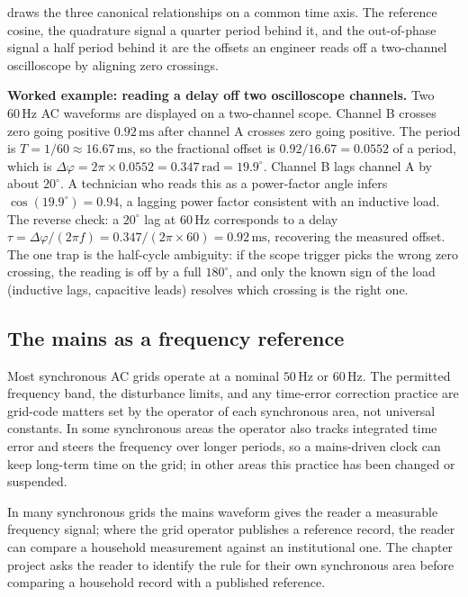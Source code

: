  draws the three canonical
relationships on a common time axis. The reference cosine, the
quadrature signal a quarter period behind it, and the out-of-phase
signal a half period behind it are the offsets an engineer reads off
a two-channel oscilloscope by aligning zero crossings.



\textbf{Worked example: reading a delay off two oscilloscope
channels.} Two $60 \,\si{\hertz}$ AC waveforms are displayed on a
two-channel scope. Channel B crosses zero going positive $0.92 \,\si
{\milli\second}$ after channel A crosses zero going positive. The
period is $T = 1/60 \approx 16.67 \,\si{\milli\second}$, so the
fractional offset is $0.92/16.67 = 0.0552$ of a period, which is
$\Delta\varphi = 2\pi \times 0.0552 = 0.347 \,\si{\radian} =
19.9^{\circ}$. Channel B lags channel A by about $20^{\circ}$. A
technician who reads this as a power-factor angle infers
$\cos(19.9^{\circ}) = 0.94$, a lagging power factor consistent with
an inductive load. The reverse check: a $20^{\circ}$ lag at $60 \,\si
{\hertz}$ corresponds to a delay $\tau = \Delta\varphi/(2\pi f) =
0.347/(2\pi \times 60) = 0.92 \,\si{\milli\second}$, recovering the
measured offset. The one trap is the half-cycle ambiguity: if the
scope trigger picks the wrong zero crossing, the reading is off by a
full $180^{\circ}$, and only the known sign of the load (inductive
lags, capacitive leads) resolves which crossing is the right one.

\subsection{The mains as a frequency reference}

Most synchronous AC grids operate at a nominal $50 \,\si{\hertz}$ or
$60 \,\si{\hertz}$. The permitted frequency band, the disturbance
limits, and any time-error correction practice are grid-code
matters set by the operator of each synchronous area, not universal
constants. In some synchronous areas the operator also tracks
integrated time error and steers the frequency over longer periods,
so a mains-driven clock can keep long-term time on the grid; in
other areas this practice has been changed or suspended.

In many synchronous grids the mains waveform gives the reader a
measurable frequency signal; where the grid operator publishes a
reference record, the reader can compare a household measurement
against an institutional one. The chapter project asks the reader
to identify the rule for their own synchronous area before
comparing a household record with a published reference.

